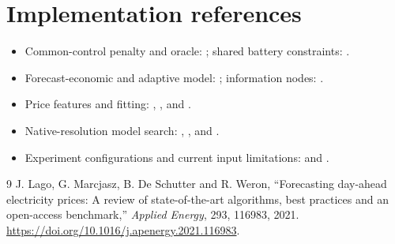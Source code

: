 \documentclass[11pt,a4paper]{article}
\begin{document}
\section{Implementation references}
\begin{itemize}
\item Common-control penalty and oracle: ; shared battery constraints: .
\item Forecast-economic and adaptive model: ; information nodes: .
\item Price features and fitting: , , and .
\item Native-resolution model search: , , and .
\item Experiment configurations and current input limitations:  and .
\end{itemize}
\begin{thebibliography}{9}
 J. Lago, G. Marcjasz, B. De Schutter and R. Weron,
``Forecasting day-ahead electricity prices: A review of state-of-the-art algorithms,
best practices and an open-access benchmark,'' \emph{Applied Energy}, 293,
116983, 2021. \url{https://doi.org/10.1016/j.apenergy.2021.116983}.
\end{thebibliography}
\end{document}
